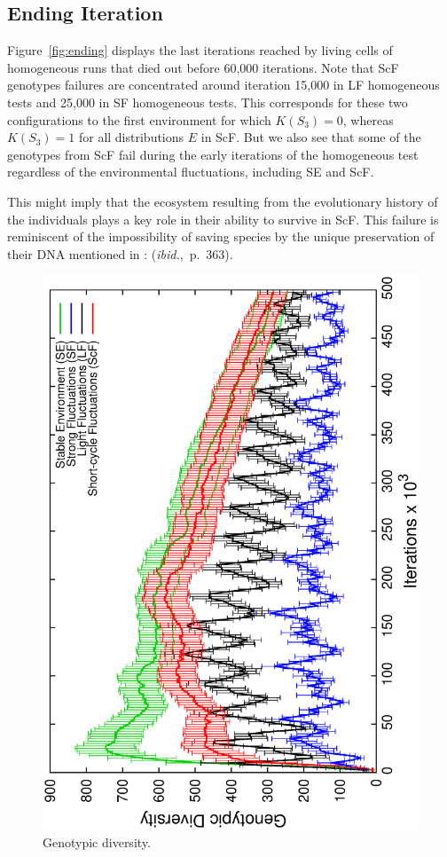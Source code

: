 \subsection{Ending Iteration}

Figure~\ref{fig:ending} displays the last iterations reached by living cells of homogeneous runs that died out before 60,000 iterations. Note that ScF genotypes failures are concentrated around iteration 15,000 in LF homogeneous tests and 25,000 in SF homogeneous tests. This corresponds for these two configurations to the first environment for which $K(S_3) = 0$, whereas $K(S_3) = 1$ for all distributions $E$ in ScF. But we also see that some of the genotypes from ScF fail during the early iterations of the homogeneous test regardless of the environmental fluctuations, including SE and ScF.

This might imply that the ecosystem resulting from the evolutionary history of the individuals plays a key role in their ability to survive in ScF. This failure is reminiscent of the impossibility of saving species by the unique preservation of their DNA mentioned in \cite{jablonka2014evolution}:  (\emph{ibid.},~p.~363).

\begin{figure}[t]
\centering
\includegraphics[width=0.7\columnwidth, angle=-90]{img/GenoDiv}
\caption{Genotypic diversity.}
\label{fig:genodiv}
\end{figure}

